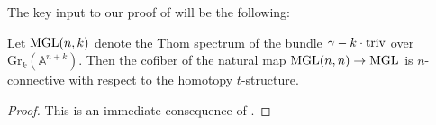 The key input to our proof of  will be the following:

\begin{lem}\label{lem:cof-conn}
  Let $\mathrm{MGL}(n,k)$ denote the Thom spectrum of the bundle $\gamma - k \cdot \mathrm{triv}$ over $\mathrm{Gr}_k (\mathbb{A}^{n+k})$.
  Then the cofiber of the natural map $\mathrm{MGL}(n,n) \to \mathrm{MGL}$ is $n$-connective with respect to the homotopy $t$-structure.
\end{lem}

\begin{proof}
  This is an immediate consequence of \cite[Lemma 3.4]{HM}.
%
\end{proof}
%
%
%
%
%
%
